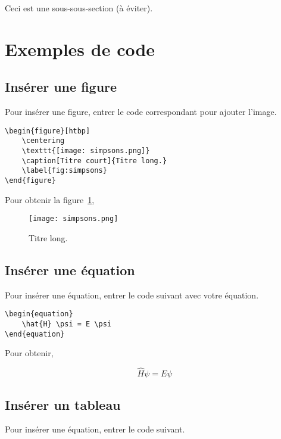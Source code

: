 Ceci est une sous-sous-section (à éviter).

\section{Exemples de code}

\subsection{Insérer une figure}

Pour insérer une figure, entrer le code correspondant pour ajouter l'image.

\begin{verbatim}
\begin{figure}[htbp]
    \centering
    \texttt{[image: simpsons.png]}
    \caption[Titre court]{Titre long.}
    \label{fig:simpsons}
\end{figure}
\end{verbatim}

Pour obtenir la figure~\ref{fig:simpsons},

\begin{figure}[htbp]
    \centering
    \texttt{[image: simpsons.png]}
    \caption{Titre long.}
    \label{fig:simpsons}
\end{figure}

\subsection{Insérer une équation}

Pour insérer une équation, entrer le code suivant avec votre équation.

\begin{verbatim}
\begin{equation}
    \hat{H} \psi = E \psi
\end{equation}
\end{verbatim}

Pour obtenir,

\begin{equation}
    \hat{H} \psi = E \psi
\end{equation}

\subsection{Insérer un tableau}

Pour insérer une équation, entrer le code suivant.


